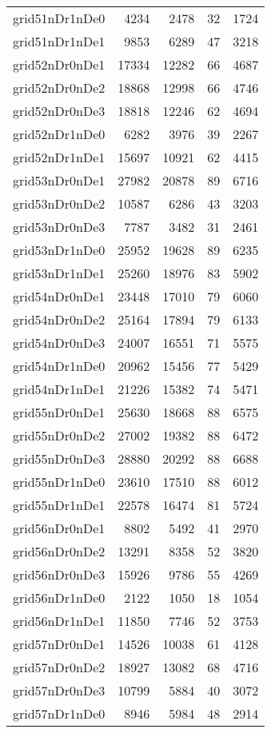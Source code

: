 \begin{longtable}{lrrrr}
grid51nDr1nDe0 & 4234 & 2478 & 32 & 1724 \\
grid51nDr1nDe1 & 9853 & 6289 & 47 & 3218 \\
grid52nDr0nDe1 & 17334 & 12282 & 66 & 4687 \\
grid52nDr0nDe2 & 18868 & 12998 & 66 & 4746 \\
grid52nDr0nDe3 & 18818 & 12246 & 62 & 4694 \\
grid52nDr1nDe0 & 6282 & 3976 & 39 & 2267 \\
grid52nDr1nDe1 & 15697 & 10921 & 62 & 4415 \\
grid53nDr0nDe1 & 27982 & 20878 & 89 & 6716 \\
grid53nDr0nDe2 & 10587 & 6286 & 43 & 3203 \\
grid53nDr0nDe3 & 7787 & 3482 & 31 & 2461 \\
grid53nDr1nDe0 & 25952 & 19628 & 89 & 6235 \\
grid53nDr1nDe1 & 25260 & 18976 & 83 & 5902 \\
grid54nDr0nDe1 & 23448 & 17010 & 79 & 6060 \\
grid54nDr0nDe2 & 25164 & 17894 & 79 & 6133 \\
grid54nDr0nDe3 & 24007 & 16551 & 71 & 5575 \\
grid54nDr1nDe0 & 20962 & 15456 & 77 & 5429 \\
grid54nDr1nDe1 & 21226 & 15382 & 74 & 5471 \\
grid55nDr0nDe1 & 25630 & 18668 & 88 & 6575 \\
grid55nDr0nDe2 & 27002 & 19382 & 88 & 6472 \\
grid55nDr0nDe3 & 28880 & 20292 & 88 & 6688 \\
grid55nDr1nDe0 & 23610 & 17510 & 88 & 6012 \\
grid55nDr1nDe1 & 22578 & 16474 & 81 & 5724 \\
grid56nDr0nDe1 & 8802 & 5492 & 41 & 2970 \\
grid56nDr0nDe2 & 13291 & 8358 & 52 & 3820 \\
grid56nDr0nDe3 & 15926 & 9786 & 55 & 4269 \\
grid56nDr1nDe0 & 2122 & 1050 & 18 & 1054 \\
grid56nDr1nDe1 & 11850 & 7746 & 52 & 3753 \\
grid57nDr0nDe1 & 14526 & 10038 & 61 & 4128 \\
grid57nDr0nDe2 & 18927 & 13082 & 68 & 4716 \\
grid57nDr0nDe3 & 10799 & 5884 & 40 & 3072 \\
grid57nDr1nDe0 & 8946 & 5984 & 48 & 2914 \\

\end{longtable}
